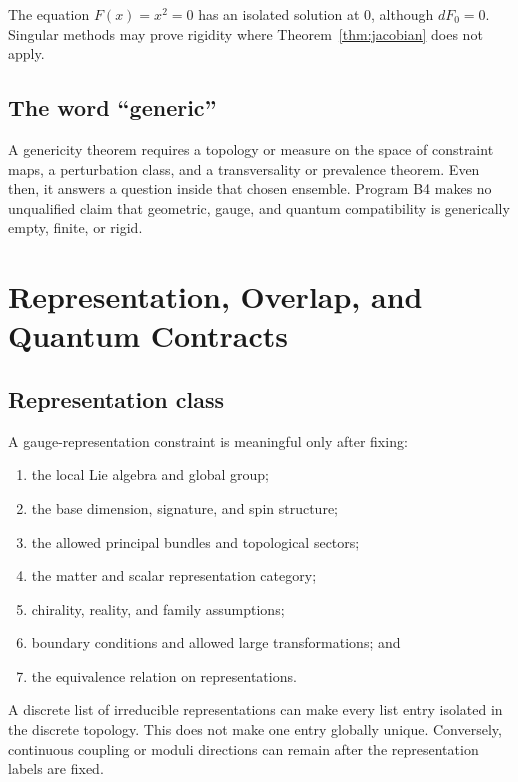 \documentclass[11pt]{article}
\begin{document}
\begin{remark}
The equation $F(x)=x^2=0$ has an isolated solution at $0$, although
$dF_0=0$.  Singular methods may prove rigidity where
Theorem~\ref{thm:jacobian} does not apply.
\end{remark}

\subsection{The word ``generic''}

A genericity theorem requires a topology or measure on the space of constraint
maps, a perturbation class, and a transversality or prevalence theorem.  Even
then, it answers a question inside that chosen ensemble.  Program B4 makes no
unqualified claim that geometric, gauge, and quantum compatibility is
generically empty, finite, or rigid.

\section{Representation, Overlap, and Quantum Contracts}

\subsection{Representation class}

A gauge-representation constraint is meaningful only after fixing:
\begin{enumerate}
\item the local Lie algebra and global group;
\item the base dimension, signature, and spin structure;
\item the allowed principal bundles and topological sectors;
\item the matter and scalar representation category;
\item chirality, reality, and family assumptions;
\item boundary conditions and allowed large transformations; and
\item the equivalence relation on representations.
\end{enumerate}

A discrete list of irreducible representations can make every list entry
isolated in the discrete topology.  This does not make one entry globally
unique.  Conversely, continuous coupling or moduli directions can remain after
the representation labels are fixed.
\end{document}
